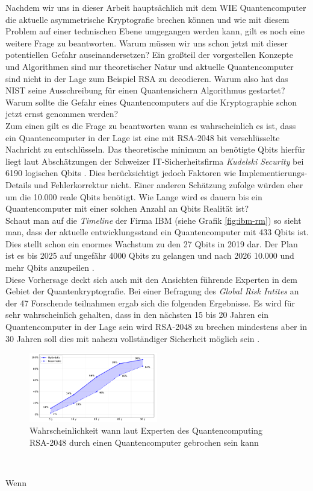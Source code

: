 Nachdem wir uns in dieser Arbeit hauptsächlich mit dem WIE Quantencomputer die aktuelle asymmetrische Kryptografie brechen können und wie mit diesem Problem auf einer technischen Ebene umgegangen werden kann, gilt es noch eine weitere Frage zu beantworten. Warum müssen wir uns schon jetzt mit dieser potentiellen Gefahr auseinandersetzen? Ein großteil der vorgestellen Konzepte und Algorithmen sind nur theoretischer Natur und aktuelle Quantencomputer sind nicht in der Lage zum Beispiel RSA zu decodieren. Warum also hat das NIST seine Ausschreibung für einen Quantensichern Algorithmus gestartet? Warum sollte die Gefahr eines Quantencomputers auf die Kryptographie schon jetzt ernst genommen werden?\\
Zum einen gilt es die Frage zu beantworten wann es  wahrscheinlich es ist, dass ein Quantencomputer in der Lage ist eine mit RSA-2048 bit verschlüsselte Nachricht zu entschlüsseln. Das theoretische minimum an benötigte Qbits hierfür liegt laut Abschätzungen der Schweizer IT-Sicherheitsfirma \textit{Kudelski Security} bei 6190 logischen Qbits \cite{gagliardoni_quantum_2021}. Dies berücksichtigt jedoch Faktoren wie Implementierungs-Details und Fehlerkorrektur nicht. Einer anderen Schätzung zufolge würden eher um die 10.000 reale Qbits benötigt\cite{ziegler_online_2015}. Wie Lange wird es dauern bis ein Quantencomputer mit einer solchen Anzahl an Qbits Realität ist?\\
Schaut man auf die \textit{Timeline} der Firma IBM (siehe Grafik \ref{fig:ibm-rm}) so sieht man, dass der aktuelle entwicklungsstand ein Quantencomputer mit 433 Qbits ist. Dies stellt schon ein enormes Wachstum zu den 27 Qbits in 2019 dar. Der Plan ist es bis 2025 auf ungefähr 4000 Qbits zu gelangen und nach 2026 10.000 und mehr Qbits anzupeilen \cite{noauthor_ibm_2015}.\\
Diese Vorhersage deckt sich auch mit den Ansichten führende Experten in dem Gebiet der Quantenkryptografie. Bei einer Befragung des \textit{Global Risk Intites} an der 47 Forschende teilnahmen ergab sich die folgenden Ergebnisse. Es wird für sehr wahrscheinlich gehalten, dass in den nächsten 15 bis 20 Jahren ein Quantencomputer in der Lage sein wird RSA-2048 zu brechen mindestens aber in 30 Jahren soll dies mit nahezu vollständiger Sicherheit möglich sein \cite{noauthor_2021_nodate}.

\begin{figure}[!hbt]
    \centering
    \includegraphics[width=0.5\textwidth]{images/estiamte-qc.png}
    \caption{Wahrscheinlichkeit wann laut Experten des Quantencomputing RSA-2048 durch einen Quantencomputer gebrochen sein kann \cite{noauthor_2021_nodate}}
    \label{fig:qx-approx}
\end{figure}\

Wenn 